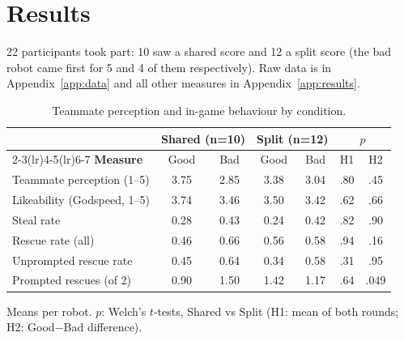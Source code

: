 \section{Results}

22 participants took part: 10 saw a shared score and 12 a split score (the bad robot came first for 5 and 4 of them respectively). Raw data is in Appendix~\ref{app:data} and all other measures in Appendix~\ref{app:results}.

\begin{table}[H]
\centering
\small
\setlength{\tabcolsep}{5pt}
\begin{tabular}{lcccccc}
\toprule
 & \multicolumn{2}{c}{\textbf{Shared} (n=10)} & \multicolumn{2}{c}{\textbf{Split} (n=12)} & \multicolumn{2}{c}{\textbf{$p$}} \\
\cmidrule(lr){2-3}\cmidrule(lr){4-5}\cmidrule(lr){6-7}
\textbf{Measure} & Good & Bad & Good & Bad & H1 & H2 \\
\midrule
Teammate perception (1--5) & 3.75 & 2.85 & 3.38 & 3.04 & .80 & .45 \\
Likeability (Godspeed, 1--5) & 3.74 & 3.46 & 3.50 & 3.42 & .62 & .66 \\
\midrule
Steal rate & 0.28 & 0.43 & 0.24 & 0.42 & .82 & .90 \\
Rescue rate (all) & 0.46 & 0.66 & 0.56 & 0.58 & .94 & .16 \\
Unprompted rescue rate & 0.45 & 0.64 & 0.34 & 0.58 & .31 & .95 \\
Prompted rescues (of 2) & 0.90 & 1.50 & 1.42 & 1.17 & .64 & .049 \\
\bottomrule
\end{tabular}
\par\smallskip\raggedright\footnotesize
Means per robot. $p$: Welch's $t$-tests, Shared vs Split (H1: mean of both rounds; H2: Good$-$Bad difference).
\caption{Teammate perception and in-game behaviour by condition.}
\label{tab:results}
\end{table}
